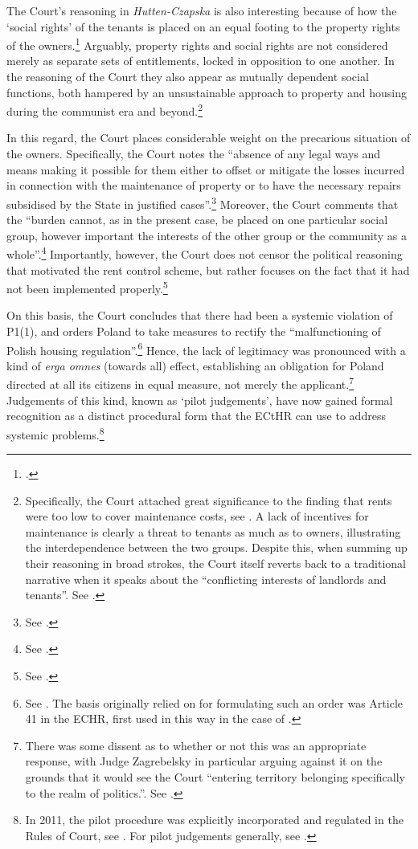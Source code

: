 The Court's reasoning in {\it Hutten-Czapska} is also interesting because of how the `social rights' of the tenants is placed on an equal footing to the property rights of the owners.\footcite[225]{hutten06} Arguably, property rights and social rights are not considered merely as separate sets of entitlements, locked in opposition to one another. In the reasoning of the Court they also appear as mutually dependent social functions, both hampered by an unsustainable approach to property and housing during the communist era and beyond.\footnote{Specifically, the Court attached great significance to the finding that rents were too low to cover maintenance costs, see \cite[224]{hutten06}. A lack of incentives for maintenance is clearly a threat to tenants as much as to owners, illustrating the interdependence between the two groups. Despite this, when summing up their reasoning in broad strokes, the Court itself reverts back to a traditional narrative when it speaks about the ``conflicting interests of landlords and tenants''. See \cite[225]{hutten06}.}

In this regard, the Court places considerable weight on the precarious situation of the owners. Specifically, the Court notes the ``absence of any legal ways and means making it possible for them either to offset or mitigate the losses incurred in connection with the maintenance of property or to have the necessary repairs subsidised by the State in justified cases''.\footnote{See \cite[224]{hutten06}.} Moreover, the Court comments that the ``burden cannot, as in the present case, be placed on one particular social group, however important the interests of the other group or the community as a whole''.\footnote{See \cite[225]{hutten06}.} Importantly, however, the Court does not censor the political reasoning that motivated the rent control scheme, but rather focuses on the fact that it had not been implemented properly.\footnote{See \cite[224]{hutten06}.}

On this basis, the Court concludes that there had been a systemic violation of P1(1), and orders Poland to take measures to rectify the ``malfunctioning of Polish housing regulation''.\footnote{See \cite[237]{hutten06}. The basis originally relied on for formulating such an order was Article 41 in the ECHR, first used in this way in the case of \cite{broniowski05}.} Hence, the lack of legitimacy was pronounced with a kind of {\it erga omnes} (towards all) effect, establishing an obligation for Poland directed at all its citizens in equal measure, not merely the applicant.\footnote{There was some dissent as to whether or not this was an appropriate response, with Judge Zagrebelsky in particular arguing against it on the grounds that it would see the Court ``entering territory belonging specifically to the realm of politics.''. See \cite{hutten06}.} Judgements of this kind, known as `pilot judgements', have now gained formal recognition as a distinct procedural form that the ECtHR can use to address systemic problems.\footnote{In 2011, the pilot procedure was explicitly incorporated and regulated in the Rules of Court, see \cite[87]{leach11}. For pilot judgements generally, see \cite{leach10}.}

